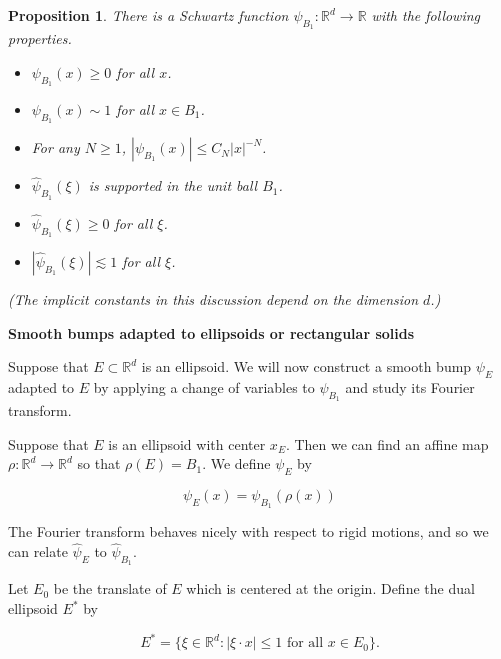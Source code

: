 \documentclass{amsart}
\newtheorem{prop}[theorem]{Proposition}
\newcommand{\RR}{\mathbb{R}}
\begin{document}
\begin{prop} \label{propbump1} There is a Schwartz function $\psi_{B_1}: \RR^d \rightarrow \RR$ with the following properties.

\begin{itemize}

\item $\psi_{B_1}(x) \ge 0$ for all $x$.

\item $\psi_{B_1}(x) \sim 1$ for all $x \in B_1$.

\item For any $N \ge 1$,  $| \psi_{B_1}(x) | \le C_N |x|^{-N}$.

\item $\hat \psi_{B_1}(\xi)$ is supported in the unit ball $B_1$.

\item $\hat \psi_{B_1}(\xi) \ge 0$ for all $\xi$.

\item $|\hat \psi_{B_1}(\xi)| \lesssim 1$ for all $\xi$.  

\end{itemize}

(The implicit constants in this discussion depend on the dimension $d$.)

\end{prop}

\vskip10pt

{\bf Smooth bumps adapted to ellipsoids or rectangular solids}

\vskip10pt

Suppose that $E \subset \RR^d$ is an ellipsoid.   We will now construct a smooth bump $\psi_E$ adapted to $E$ by applying a change of variables to $\psi_{B_1}$ and study its Fourier transform.

Suppose that $E$ is an ellipsoid with center $x_E$.   Then we can find an  affine map $\rho: \RR^d \rightarrow \RR^d$ so that $\rho(E) = B_1$.   We define $\psi_E$ by

\begin{equation} \label{defpsiE}
\psi_E(x) = \psi_{B_1}(\rho(x))
\end{equation}

The Fourier transform behaves nicely with respect to rigid motions,  and so we can relate $\hat \psi_E$ to $\hat \psi_{B_1}$. 

Let $E_0$ be the translate of $E$ which is centered at the origin.   Define the dual ellipsoid $E^*$ by

$$ E^* = \{ \xi \in \RR^d: |\xi \cdot x| \le 1 \textrm{ for all } x \in E_0 \}. $$
\end{document}
